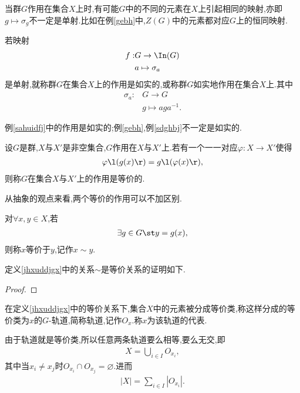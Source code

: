 当群$G$作用在集合$X$上时,有可能$G$中的不同的元素在$X$上引起相同的映射,亦即$g\mapsto\sigma_g$不一定是单射.比如在例\ref{gebh}中,$Z(G)$中的元素都对应$G$上的恒同映射.
\begin{definition}[如实的]
    若映射\begin{align*}
        f:&G\to\In(G)\\
        &a\mapsto\sigma_a
    \end{align*}是单射,就称群$G$在集合$X$上的作用是如实的,或称群$G$如实地作用在集合$X$上.其中\begin{align}
        \sigma_a:&G\to G\nonumber\\
        &g\mapsto aga^{-1}\nonumber.
    \end{align}
\end{definition}
\begin{remark}
    例\ref{sahuidfj}中的作用是如实的;例\ref{gebh},例\ref{sdghbj}不一定是如实的.
\end{remark}
\begin{definition}[等价的]
    设$G$是群,$X$与$X'$是非空集合,$G$作用在$X$与$X'$上.若有一个一一对应$\varphi:X\to X'$使得\begin{align*}
        \varphi\l(g(x)\r)=g\l(\varphi(x)\r),
    \end{align*}则称$G$在集合$X$与$X'$上的作用是等价的.
\end{definition}
从抽象的观点来看,两个等价的作用可以不加区别.
\begin{definition}[集合$X$上的等价关系]\label{jhxuddjgx}
    对$\forall x,y\in X$,若\begin{align*}
        \exists g\in G\st y=g(x),
    \end{align*}则称$x$等价于$y$,记作$x\sim y$.
\end{definition}
\begin{remark}
    定义\ref{jhxuddjgx}中的关系$\sim$是等价关系的证明如下.
    \begin{proof}
        \stars
    \end{proof}
\end{remark}
\begin{definition}[$G$-轨道]
    在定义\ref{jhxuddjgx}中的等价关系下,集合$X$中的元素被分成等价类,称这样分成的等价类为$x$的$G$-轨道,简称轨道,记作$O_x$.称$x$为该轨道的代表.
\end{definition}
\begin{remark}\label{sdaujnf}
    由于轨道就是等价类,所以任意两条轨道要么相等,要么无交,即\begin{align*}
        X=\bigcup_{i\in I}O_{x_i},
    \end{align*}其中当$x_i\neq x_j$时$O_{x_i}\cap O_{x_j}=\varnothing$.进而\begin{align*}
        |X|=\sum_{i\in I}|O_{x_i}|.
    \end{align*}
\end{remark}
